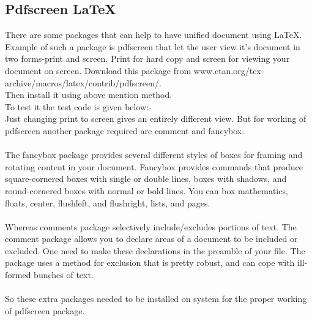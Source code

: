 \subsection{Pdfscreen \LaTeX{}}
There are some packages that can help to have unified document using \LaTeX{}. Example of such a package is pdfscreen that let the user view it’s document in two forms-print and screen. Print for hard copy and screen for viewing your document on screen. Download this package from www.ctan.org/tex-archive/macros/latex/contrib/pdfscreen/.\\
Then install it using above mention method.\\
To test it the test code is given below:-\\
Just changing print to screen gives an entirely different view. But for working of pdfscreen another package required are comment and fancybox.\\\\
The fancybox package provides several different styles of boxes for framing and rotating content in your document. Fancybox provides commands that produce square-cornered boxes with single or double lines, boxes with shadows, and round-cornered boxes with normal or bold lines. You can box mathematics, floats, center, flushleft, and flushright, lists, and pages.\\\\
Whereas comments package selectively include/excludes portions of text. The comment package allows you to declare areas of a document to be included or excluded. One need to make these declarations in the preamble of your file. The package uses a method for exclusion that is pretty robust, and can cope with ill-formed bunches of text.\\\\
So these extra packages needed to be installed on system for the proper working of pdfscreen package.
